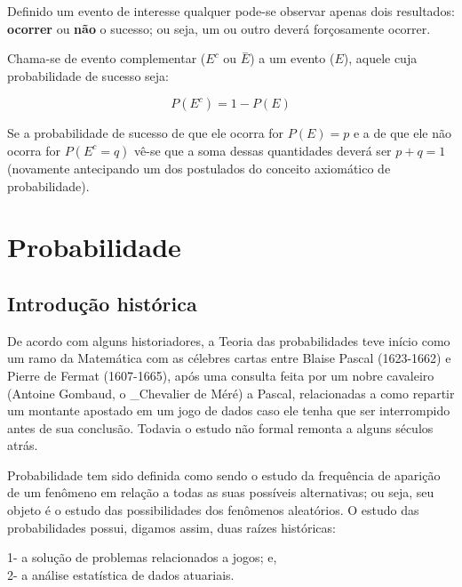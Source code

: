 \documentclass[
]{book}
\begin{document}
Definido um evento de interesse qualquer pode-se observar apenas dois resultados: \textbf{ocorrer} ou \textbf{não} o sucesso; ou seja, um ou outro deverá forçosamente ocorrer.

Chama-se de evento complementar (\(E^{c}\) ou \(\stackrel{-}{E}\)) a um evento (\(E\)), aquele cuja probabilidade de sucesso seja:

\[
P(E^{c}) = 1 - P(E)
\]

Se a probabilidade de sucesso de que ele ocorra for \(P(E)=p\) e a de que ele não ocorra for \(P(E^{c}= q)\) vê-se que a soma dessas quantidades deverá ser \(p + q =1\) (novamente antecipando um dos postulados do conceito axiomático de probabilidade).

\hypertarget{probabilidade-1}{%
\section{Probabilidade}\label{probabilidade-1}}

\hypertarget{introduuxe7uxe3o-histuxf3rica}{%
\subsection{Introdução histórica}\label{introduuxe7uxe3o-histuxf3rica}}

De acordo com alguns historiadores, a Teoria das probabilidades teve início como um ramo da Matemática com as célebres cartas entre Blaise Pascal (1623-1662) e Pierre de Fermat (1607-1665), após uma consulta feita por um nobre cavaleiro (Antoine Gombaud, o \_Chevalier de Méré) a Pascal, relacionadas a como repartir um montante apostado em um jogo de dados caso ele tenha que ser interrompido antes de sua conclusão. Todavia o estudo não formal remonta a alguns séculos atrás.

\hfill\break

Probabilidade tem sido definida como sendo o estudo da frequência de aparição de um fenômeno em relação a todas as suas possíveis alternativas; ou seja, seu objeto é o estudo das possibilidades dos fenômenos aleatórios. O estudo das probabilidades possui, digamos assim, duas raízes históricas:

\hfill\break

1- a solução de problemas relacionados a jogos; e,\\
2- a análise estatística de dados atuariais.

\hfill\break
\end{document}
